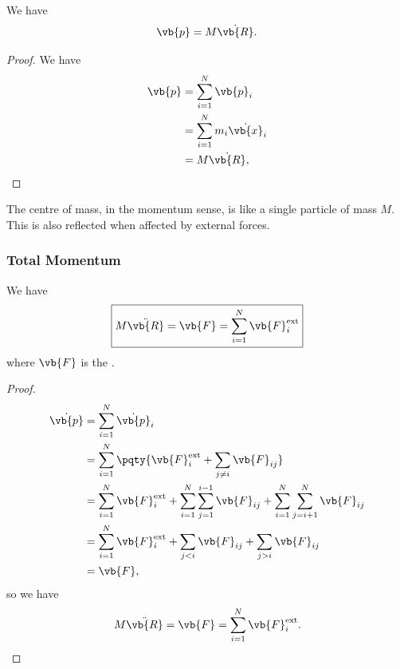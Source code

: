 \begin{proposition}
    \label{prop:centre-of-mass-total-momentum}%
    We have
    \begin{equation}
        \vb{p} = M \dot{\vb{R}}.
    \end{equation}
\end{proposition}

\begin{proof}
    We have
    \begin{subequations}\begin{align}
        \vb{p} &= \sum_{i = 1}^{N} \vb{p}_i \\
        &= \sum_{i = 1}^{N} m_i \dot{\vb{x}}_{i} \\
        &= M \dot{\vb{R}},
    \end{align}\end{subequations}
\end{proof}

The centre of mass, in the momentum sense, is like a single particle of mass \(M\). This is also reflected when affected by external forces.

\subsubsection{Total Momentum}

\begin{proposition}
    We have
    \begin{equation}
        \boxed{M \ddot{\vb{R}} = \vb{F} = \sum_{i = 1}^{N} \vb{F}_i^{\text{ext}}}
    \end{equation}
    where \(\vb{F}\) is the .
\end{proposition}

\begin{proof}
    \begin{subequations}\begin{align}
        \dot{\vb{p}} &= \sum_{i = 1}^{N} \dot{\vb{p}}_i \\
        &= \sum_{i = 1}^{N} \pqty{\vb{F}_i^{\text{ext}} + \sum_{j \neq i} \vb{F}_{ij}} \\
        &= \sum_{i = 1}^{N} \vb{F}_i^{\text{ext}} + \sum_{i = 1}^{N} \sum_{j = 1}^{i - 1} \vb{F}_{ij} + \sum_{i = 1}^{N} \sum_{j = i + 1}^{N} \vb{F}_{ij} \\
        &= \sum_{i = 1}^{N} \vb{F}_i^{\text{ext}} + \sum_{j < i} \vb{F}_{ij} + \sum_{j > i} \vb{F}_{ij} \\
        &= \vb{F},
    \end{align}\end{subequations}
    so we have
    \begin{equation}
        M \ddot{\vb{R}} = \vb{F} = \sum_{i = 1}^{N} \vb{F}_i^{\text{ext}}.
    \end{equation}
\end{proof}

